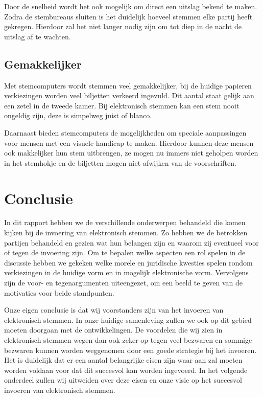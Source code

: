 \documentclass[a4paper]{article}
\begin{document}
Door de snelheid wordt het ook mogelijk om direct een uitslag bekend te maken.
Zodra de stembureaus sluiten is het duidelijk hoeveel stemmen elke partij heeft gekregen.
Hierdoor zal het niet langer nodig zijn om tot diep in de nacht de uitslag af te wachten.

\subsection{Gemakkelijker}
Met stemcomputers wordt stemmen veel gemakkelijker, bij de huidige papieren verkiezingen worden veel biljetten verkeerd ingevuld.
Dit aantal staat gelijk aan een zetel in de tweede kamer.
Bij elektronisch stemmen kan een stem nooit ongeldig zijn, deze is simpelweg juist of blanco.

Daarnaast bieden stemcomputers de mogelijkheden om speciale aanpassingen voor mensen met een visuele handicap te maken.
Hierdoor kunnen deze mensen ook makkelijker hun stem uitbrengen, ze mogen nu immers niet geholpen worden in het stemhokje en de biljetten mogen niet afwijken van de voorschriften.

\newpage

\section{Conclusie}
In dit rapport hebben we de verschillende onderwerpen behandeld die komen kijken bij de invoering van elektronisch stemmen.
Zo hebben we de betrokken partijen behandeld en gezien wat hun belangen zijn en waarom zij eventueel voor of tegen de invoering zijn.
Om te bepalen welke aspecten een rol spelen in de discussie hebben we gekeken welke morele en juridische kwesties spelen rondom verkiezingen in de huidige vorm en in mogelijk elektronische vorm.
Vervolgens zijn de voor- en tegenargumenten uiteengezet, om een beeld te geven van de motivaties voor beide standpunten.

Onze eigen conclusie is dat wij voorstanders zijn van het invoeren van elektronisch stemmen.
In onze huidige samenleving zullen we ook op dit gebied moeten doorgaan met de ontwikkelingen.
De voordelen die wij zien in elektronisch stemmen wegen dan ook zeker op tegen veel bezwaren en sommige bezwaren kunnen worden weggenomen door een goede strategie bij het invoeren.
Het is duidelijk dat er een aantal belangrijke eisen zijn waar aan zal moeten worden voldaan voor dat dit succesvol kan worden ingevoerd.
In het volgende onderdeel zullen wij uitweiden over deze eisen en onze visie op het succesvol invoeren van elektronisch stemmen.
\end{document}
